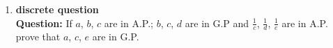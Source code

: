 \documentclass{article}
\begin{document}
\begin{enumerate}


\item \textbf{discrete question}\\
\textbf{Question:} 
If $a$, $b$, $c$ are in A.P.; $b$, $c$, $d$ are in G.P and $\frac{1}{c}$, $\frac{1}{d}$, $\frac{1}{e}$ are in A.P. prove that $a$, $c$, $e$ are in G.P.\\


\end{enumerate}
\end{document}
